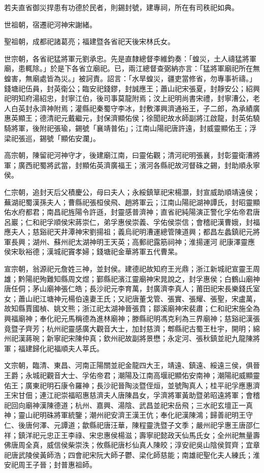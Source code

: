 \begin{pinyinscope}
若夫直省御災捍患有功德於民者，則錫封號，建專祠，所在有司秩祀如典。

世祖朝，宿遷祀河神宋謝緒。

聖祖朝，成都祀諸葛亮；福建暨各省祀天後宋林氏女。

世宗朝，各省祀猛將軍元劉承忠。先是直隸總督李維鈞奏：「蝗災，土人禱猛將軍廟，患輒除。」於是下各省立廟祀。已，兩江總督查弼納亦言：「猛將軍廟祀所在無蝗害，無廟處皆為災。」被訶責。詔言：「水旱蝗災，疆吏當修省，勿專事祈禱。」錢塘祀伍員，封英衛公；臨安祀錢鏐，封誠應王；蕭山祀宋張夏，封靜安公；紹興祀明知府湯紹忠，封寧江伯，後司事莫龍附焉；汶上祀明尚書宋禮，封寧漕公，老人白英封永濟神附焉；灌縣祀秦蜀守李冰，封敷澤興濟通裕王，子二郎，為承績廣惠英顯王；德清祀元戴繼元，封保濟顯佑侯；徐聞祀故水師副將江啟龍，封英佑驍騎將軍，後附祀張瑜，錫號「襄靖普佑」；江南山陽祀唐許遠，封威靈顯佑王；浮梁祀張巡，錫號「顯佑安瀾」。

高宗朝，陳留祀河神守才，後建廟江南，曰靈佑觀；清河祀明張襄，封彰靈衛漕將軍；廣西祀蜀將武當，封顯佑英濟廣福王；濱河各縣祀故河督硃之錫，封助順永寧侯。

仁宗朝，追封天后父積慶公，母曰夫人；永綏鎮筸祀宋楊灝，封宣威助順靖遠侯；蕪湖祀蜀漢孫夫人；曹縣祀張桓侯飛、趙將軍云；江南山陽祀湖神譚氏，封昭靈顯佑水府都君；南昌祀旌陽令許遜，封靈感普濟神；直省祀純陽演正警化孚佑帝君唐呂巖；仁和祀孚順侯宋蔣崇仁，弟孚惠侯崇義、孚佑侯崇信；會稽祀漢曹娥，封福應夫人；慈谿祀天井潭神宋劉揚祖；義烏祀明漕運總管陳道興；都昌左蠡鎮祀元將軍長興；湖州、蘇州祀太湖神明王天英；高郵祀露筋祠神；淮揚運河祀康澤靈應侯宋耿裕德；漢城祀竇孝婦；錢塘祀金華將軍五代曹杲。

宣宗朝，翁源祀元詹姓三神，並封侯。建德祀故知府王光鼎；浙江新城祀宣靈王周雄；黔陽祀殉難知縣周文煜；鄞縣祀濱江靈廟神宋晁說之，封孚惠侯；白鶴山廟神唐任侗；茅山廟神張仁皓；長沙祀元李育萬，封廣濟李真人；莆田祀宋長樂錢氏室女；蕭山祀江塘神元楊伯遠妻王氏；又祀唐董戈管、張實、張耀、張聖，宋盧萬，故知縣賈國楨、姚文熊；浙江祀太湖神晉張賁；鄒溪廟神宋裴肅；仁和祀宋施全為興福廟神；奉化祀元馬稱德為進林廟神；滕縣祀明馮克利為三界廟神；慈谿祀漢張竟暨子齊芳；杭州祀靈感廣大觀音大士，加封慈濟；郫縣祀古蜀王杜宇，開明；綿州祀漢蔣琬；新寧祀宋陳仲真；欽州祀故副將景懋；永定河、張秋鎮並祀九龍陳將軍；福建歸化祀福順夫人莘氏。

文宗朝，臨清、東昌、河南正陽關並祀金龍四大王，靖遠、鎮遠、綏遠三侯，俱晉王爵；永城祀觀音大士、孚佑帝君；潮陽及江南高堰祀顯佑安南神；潮陽祀威顯靈佑王；廣東祀明石康令羅神；長沙祀晉陶淡暨侄烜，並號陶真人；桂平祀孚應惠濟王宋甘佃；連江祀崇福昭惠慈濟夫人唐陳昌女，孚濟將軍黃助暨弟昭遠將軍；會稽祀回向廟神漢陳德道；杭州、嘉興、湯陰、武昌並祀宋岳飛；三水祀玄壇正一真神；靈山祀明硃將軍統鑒；潮州祀安濟王漢王伉；奉化祀漢陳鴻；歸善祀明王守仁、後唐何澤、元譚道；歙縣祀唐汪華，陳程靈洗暨子文季；嚴州祀孚惠王唐邵仁祥；鎮洋祀元忠正王李祿、宋忠惠侯楊滋；壽寧祀懿政天仙馬氏女；全州祀無量壽佛唐周全真，威信侯柴崇泆；攸縣祀唐杉仙真人陳皎；淳安祀吳山陰侯賀齊；宜章祀唐武陵侯黃師浩；四會祀宋阮大師子鬱、梁化師慈能；南雄祀聖化夫人練氏；淮安祀周王子晉；封普惠祖師。


\end{pinyinscope}
